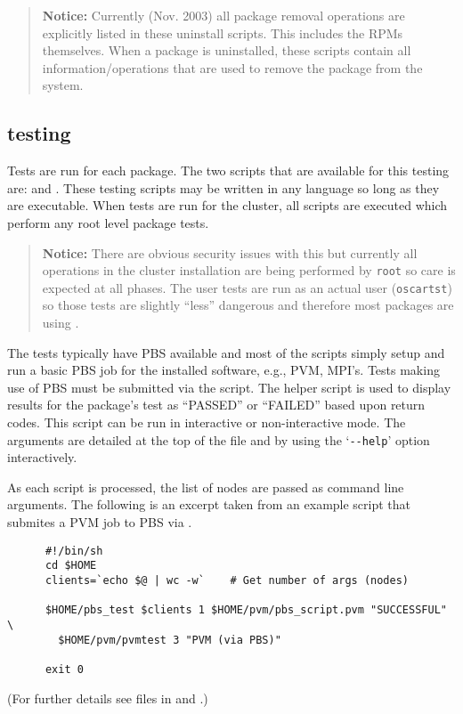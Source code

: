 \begin{verse}
   {\bfseries Notice: } Currently (Nov. 2003) all package removal 
   operations are explicitly listed in these uninstall scripts.  This
   includes the RPMs themselves.  When a package is uninstalled, these
   scripts contain all information/operations that are used to remove the
   package from the system.
\end{verse}

\subsection{testing}
\label{sect:pkg-testing}

Tests are run for each package.  The two scripts that are available for
this testing are:  and .  These testing
scripts may be written in any language so long as they are executable. When
tests are run for the cluster, all  scripts are executed
which perform any root level package tests.    

\begin{verse}
   {\bfseries Notice: } There are obvious security issues with this but
   currently all operations in the cluster installation are being performed
   by {\tt root} so care is expected at all phases.  The user tests are run
   as an actual user ({\tt oscartst}) so those tests are slightly ``less''
   dangerous and therefore most packages are using .
\end{verse}


The tests typically have PBS available and most of the 
scripts simply setup and run a basic PBS job for the installed software,
e.g., PVM, MPI's.  Tests making use of PBS must be submitted via the
 script.  The  helper script is used to
display results for the package's test as ``PASSED'' or ``FAILED'' based
upon return codes.  This script can be run in interactive or
non-interactive mode.  The arguments are detailed at the top of the 
 file and by using the `\verb=--help=' option interactively.

As each  script is processed, the list of nodes are passed
as command line arguments.  The following is an excerpt taken from an
example  script that submites a PVM job to PBS via
.
\begin{footnotesize}
\begin{verbatim}
      #!/bin/sh
      cd $HOME
      clients=`echo $@ | wc -w`    # Get number of args (nodes)

      $HOME/pbs_test $clients 1 $HOME/pvm/pbs_script.pvm "SUCCESSFUL" \
        $HOME/pvm/pvmtest 3 "PVM (via PBS)"

      exit 0
\end{verbatim}
\end{footnotesize}
(For further details see files in  and
\file{\$OSCAR\_HOME/lib/OSCAR/Package.pm}.)


